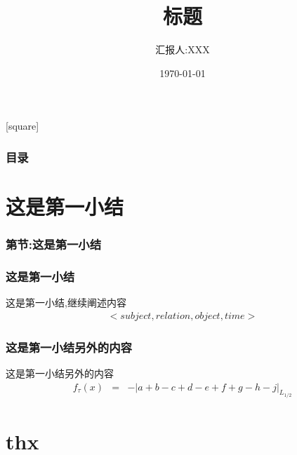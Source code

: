 \documentclass{suesppt}
\begin{document}
    \title[上海工程技术大学硕士学位论文答辩]{标题}
    \author[汇报人:XXX]{汇报人:XXX}
    \date{\today}
    \begin{frame}
        \titlepage
    \end{frame}
    [square]
    \begin{frame}
        \frametitle{目录}
        \tableofcontents
    \end{frame}

    \section{这是第一小结}
    \begin{frame}
      \frametitle{第\thesection 节:这是第一小结}
      \tableofcontents[currentsection]
    \end{frame}

    \begin{frame}
    \frametitle{这是第一小结}
    
    \hspace{2em}这是第一小结,继续阐述内容
    \begin{eqnarray}
        < subject,relation,object,time>\nonumber
    \end{eqnarray}
    \end{frame}


    \begin{frame}
        \frametitle{这是第一小结另外的内容}
        \hspace{2em}这是第一小结另外的内容
        \begin{eqnarray}
            f_{\tau}\left(x\right)&=&-\left|a+b-c+d-e+f+g-h-j\right|_{L_{1/2}}
        \end{eqnarray}
    \end{frame}

    \section*{thx}
        \begin{frame}
            \begin{center}
                \fontsize{60pt}{\baselineskip}\selectfont {}
            \end{center}
            
            \nocite{*} 
            
        \end{frame}
\end{document}
